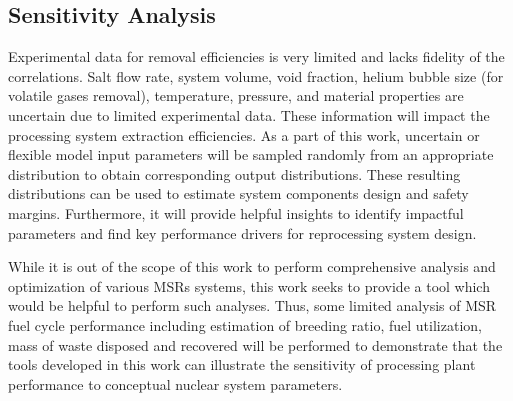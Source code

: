 \subsection{Sensitivity Analysis}
Experimental data for removal efficiencies is very limited and lacks 
fidelity of the correlations. Salt flow rate, system volume, 
void fraction, helium bubble size (for volatile gases removal), 
temperature, pressure, and material properties are uncertain due to 
limited experimental data. These information will impact the 
processing system extraction efficiencies. As a part of this work, 
uncertain or flexible model input parameters will be sampled randomly 
from an appropriate distribution to obtain corresponding output 
distributions. These resulting distributions can be used to estimate 
system components design and safety margins. Furthermore, it will 
provide helpful insights to identify impactful parameters and 
find key performance drivers for reprocessing system design.

While it is out of the scope of this work to perform comprehensive 
analysis and optimization of various \glspl{MSR} systems, this 
work seeks to provide a tool which would be helpful to perform such 
analyses. Thus, some limited analysis of \gls{MSR} fuel cycle 
performance including estimation of breeding ratio, fuel utilization, 
mass of waste disposed and recovered will be performed to demonstrate 
that the tools developed in this work can illustrate the sensitivity 
of processing plant performance to conceptual nuclear system parameters.